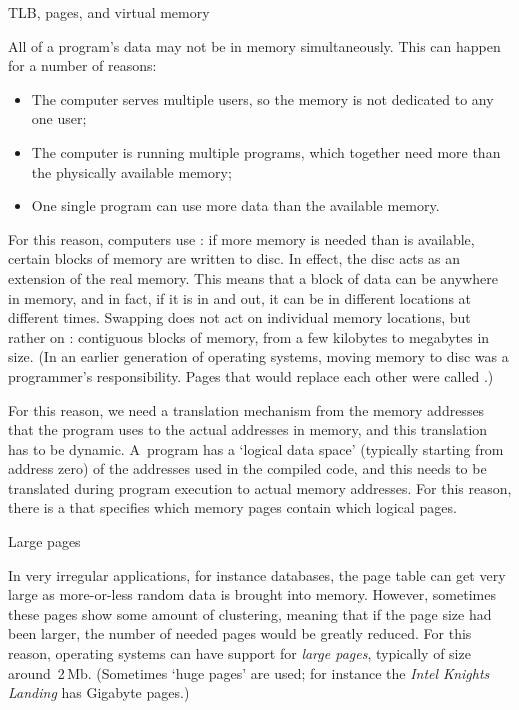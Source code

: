  {TLB, pages, and virtual memory}

All of a program's data may not be in memory simultaneously. This can
happen for a number of reasons:
\begin{itemize}
\item The computer serves multiple users, so the memory is not
  dedicated to any one user;
\item The computer is running multiple programs, which together need
  more than the physically available memory;
\item One single program can use more data than the available memory.
\end{itemize}
For this reason, computers use : if more
memory is needed than is available, certain blocks of memory are
written to disc. In effect, the disc acts as an extension of the real
memory. This means that a block of data can be anywhere in memory, and
in fact, if it is  in and out, it can be in
different locations at different times. Swapping does not act on
individual memory locations, but rather on :
contiguous blocks of memory, from a few kilobytes to megabytes in size.
(In an earlier generation of operating systems, moving memory to disc
was a programmer's responsibility. Pages that would replace each other
were called .)

For this reason, we need a translation mechanism from the memory
addresses that the program uses to the actual addresses in memory, and
this translation has to be dynamic. A~program has a `logical data
space' (typically starting from address zero) of the addresses used in
the compiled code, and this needs to be translated during program
execution to actual memory addresses. For this reason, there is a
 that specifies which memory pages contain which
logical pages.

 {Large pages}


In very irregular applications, for instance databases, the page table
can get very large as more-or-less random data is brought into
memory. However, sometimes these pages show some amount of clustering,
meaning that if the page size had been larger, the number of needed
pages would be greatly reduced. For this reason, operating systems can
have support for \emph{large pages},
typically of size around~2$\,$Mb. (Sometimes `huge pages' are used; for
instance the
\emph{Intel Knights Landing}
has Gigabyte pages.)

